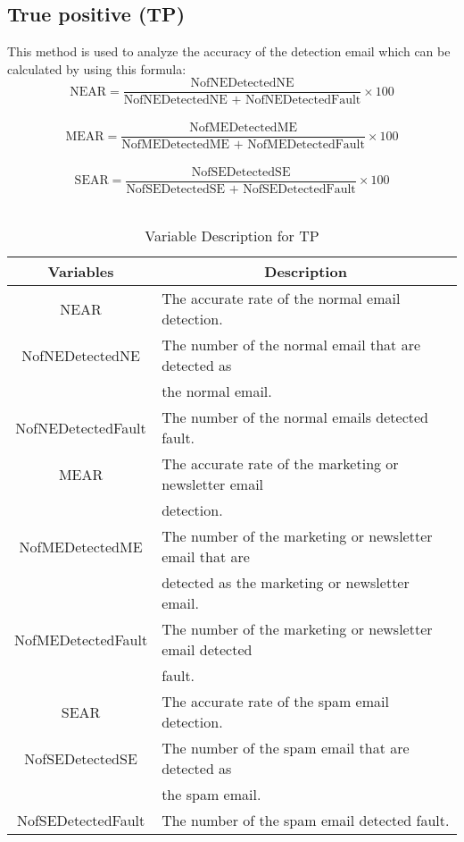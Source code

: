 \documentclass[conference]{IEEEtran}
\begin{document}
\subsection{True positive (TP)}
This method is used to analyze the accuracy of the detection email which can be calculated by using this formula:\\
$$ \text{NEAR} =  \frac{\text{NofNEDetectedNE}}{\text{NofNEDetectedNE + NofNEDetectedFault}} \times 100 $$\\
$$ \text{MEAR} =  \frac{\text{NofMEDetectedME}}{\text{NofMEDetectedME + NofMEDetectedFault}} \times 100 $$\\
$$ \text{SEAR} =  \frac{\text{NofSEDetectedSE}}{\text{NofSEDetectedSE + NofSEDetectedFault}} \times 100 $$\\

\begin{table}[!t]
\renewcommand{\arraystretch}{1.2}
\caption{Variable Description for TP}
\label{table_variableTP}
\centering
\begin{tabular}{c|l}
\hline
\bfseries Variables & \multicolumn{1}{c}{\bfseries Description}\\
\hline
NEAR & The accurate rate of the normal email detection.\\
\hline
NofNEDetectedNE & The number of the normal email that are detected as \\ & the normal email.\\
\hline
NofNEDetectedFault & The number of the normal emails detected fault.\\
\hline
MEAR & The accurate rate of the marketing or newsletter email \\ & detection.\\
\hline
NofMEDetectedME & The number of the marketing or newsletter email that are \\ & detected as the marketing or newsletter email.\\
\hline
NofMEDetectedFault & The number of the marketing or newsletter email detected \\ & fault.\\
\hline
SEAR & The accurate rate of the spam email detection.\\
\hline
NofSEDetectedSE & The number of the spam email that are detected as\\ & the spam email.\\
\hline
NofSEDetectedFault & The number of the spam email detected fault.\\
\hline
\end{tabular}
\end{table}
\end{document}
